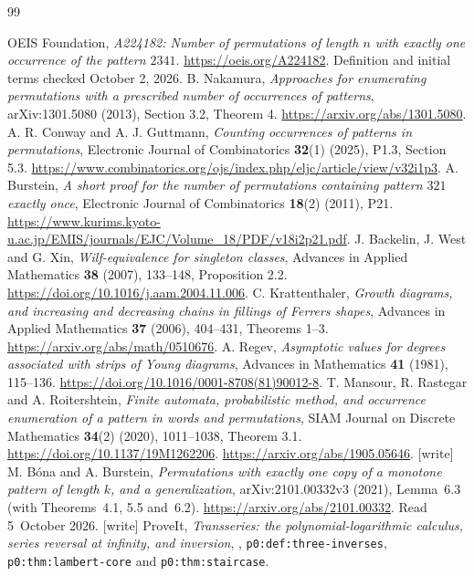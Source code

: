 \documentclass[11pt]{article}
\theoremstyle{remark}\newtheorem{remark}[theorem]{Remark}
\begin{document}
\begin{thebibliography}{99}
\small\raggedright
\setlength{\itemsep}{3pt}
 OEIS Foundation, \emph{A224182: Number of permutations of
length $n$ with exactly one occurrence of the pattern $2341$}.
\url{https://oeis.org/A224182}. Definition and initial terms checked
October 2, 2026.
 B. Nakamura, \emph{Approaches for enumerating
permutations with a prescribed number of occurrences of patterns},
arXiv:1301.5080 (2013), Section 3.2, Theorem 4.
\url{https://arxiv.org/abs/1301.5080}.
 A. R. Conway and A. J. Guttmann, \emph{Counting occurrences
of patterns in permutations}, Electronic Journal of Combinatorics
\textbf{32}(1) (2025), P1.3, Section 5.3.
\url{https://www.combinatorics.org/ojs/index.php/eljc/article/view/v32i1p3}.
 A. Burstein, \emph{A short proof for the number of
permutations containing pattern $321$ exactly once}, Electronic Journal of
Combinatorics \textbf{18}(2) (2011), P21.
\url{https://www.kurims.kyoto-u.ac.jp/EMIS/journals/EJC/Volume_18/PDF/v18i2p21.pdf}.
 J. Backelin, J. West and G. Xin, \emph{Wilf-equivalence
for singleton classes}, Advances in Applied Mathematics \textbf{38}
(2007), 133--148, Proposition 2.2.
\url{https://doi.org/10.1016/j.aam.2004.11.006}.
 C. Krattenthaler, \emph{Growth diagrams, and increasing
and decreasing chains in fillings of Ferrers shapes}, Advances in Applied
Mathematics \textbf{37} (2006), 404--431, Theorems 1--3.
\url{https://arxiv.org/abs/math/0510676}.
 A. Regev, \emph{Asymptotic values for degrees associated
with strips of Young diagrams}, Advances in Mathematics \textbf{41}
(1981), 115--136.
\url{https://doi.org/10.1016/0001-8708(81)90012-8}.
 T. Mansour, R. Rastegar and A. Roitershtein,
\emph{Finite automata, probabilistic method, and occurrence enumeration
of a pattern in words and permutations}, SIAM Journal on Discrete
Mathematics \textbf{34}(2) (2020), 1011--1038, Theorem 3.1.
\url{https://doi.org/10.1137/19M1262206}.
\url{https://arxiv.org/abs/1905.05646}.
 [write] M. B\'ona and A. Burstein, \emph{Permutations with
exactly one copy of a monotone pattern of length $k$, and a generalization},
arXiv:2101.00332v3 (2021), Lemma~6.3 (with Theorems~4.1, 5.5 and~6.2).
\url{https://arxiv.org/abs/2101.00332}. Read 5~October 2026.
 [write] ProveIt, \emph{Transseries: the
polynomial-logarithmic calculus, series reversal at infinity, and
inversion},
,
\texttt{p0:def:three-inverses}, \texttt{p0:thm:lambert-core} and
\texttt{p0:thm:staircase}.
\end{thebibliography}
\end{document}

